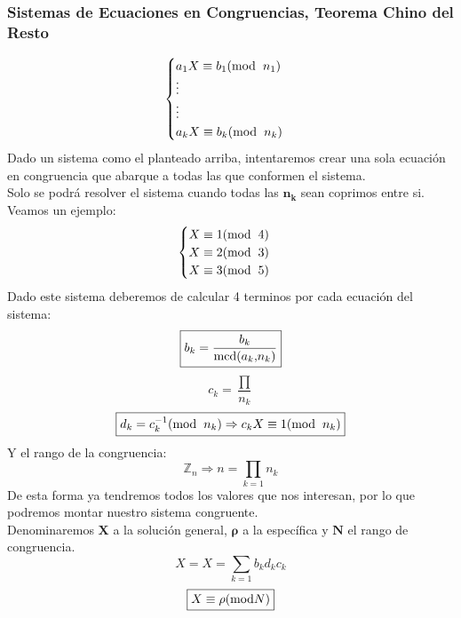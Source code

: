 \subsubsection{Sistemas de Ecuaciones en Congruencias, Teorema Chino del Resto}
\[
        \begin{cases}
                a_1X \equiv b_1(\textnormal{mod}\hspace{2mm}n_1)
                \\
                \vdots
                \\
                \vdots
                \\
                a_kX \equiv b_k(\textnormal{mod}\hspace{2mm}n_k)
        \end{cases}
\]
 Dado un sistema como el planteado arriba, intentaremos crear una sola ecuación en congruencia que abarque a todas las que conformen el sistema.\\Solo se podrá resolver el sistema cuando todas las \(\mathbf{n_k}\) sean coprimos entre si.\\Veamos un ejemplo:
\[
        \begin{cases}
                X \equiv 1(\textnormal{mod}\hspace{2mm}4)
                \\
                X \equiv 2(\textnormal{mod}\hspace{2mm}3)
                \\
                X \equiv 3(\textnormal{mod}\hspace{2mm}5)
        \end{cases}
\]
 Dado este sistema deberemos de calcular 4 terminos por cada ecuación del sistema:
\[
        \boxed{b_k = \frac{b_k}{\textnormal{mcd(}a_k\textnormal{,}n_k\textnormal{)}}}
\]
\[
        \boxed{c_k = \frac{\prod }{n_k}}
\]
\[
        \boxed{d_k = c_k^{-1} (\textnormal{mod}\hspace{2mm}n_k) \Rightarrow c_kX \equiv 1 (\textnormal{mod}\hspace{2mm}n_k)}
\]
 Y el rango de la congruencia: \[
        \boxed{\mathbb{Z}_n \Rightarrow n = \prod_{k=1} n_k}
\]
 De esta forma ya tendremos todos los valores que nos interesan, por lo que podremos montar nuestro sistema congruente.\\ Denominaremos \(\mathbf{X}\) a la solución general, \(\mathbf{\rho}\) a la específica y \(\mathbf{N}\) el rango de congruencia.
\[
        \boxed{X = X = \sum_{k=1} b_kd_kc_k}
\]
\[
        \boxed{X \equiv \rho (\textnormal{mod}N)}
\]
